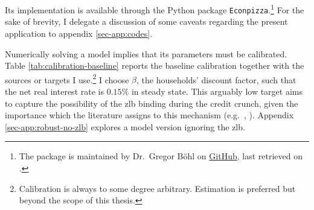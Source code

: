 \documentclass[a4paper,12pt]{article} %
\numberwithin{equation}{section} %
\numberwithin{figure}{section}
\numberwithin{table}{section}
\begin{document}
Its implementation is available through the Python package \texttt{Econpizza}.\footnote{The package is maintained by Dr.~Gregor Böhl on \href{https://github.com/gboehl/econpizza}{GitHub}, last retrieved on .} For the sake of brevity, I delegate a discussion of some caveats regarding the present application to appendix \ref{sec-app:codes}.

Numerically solving a model implies that its parameters must be calibrated. Table \ref{tab:calibration-baseline} reports the baseline calibration together with the sources or targets I use.\footnote{Calibration is always to some degree arbitrary. Estimation is preferred but beyond the scope of this thesis.} I choose $\beta$, the households' discount factor, such that the net real interest rate is $0.15\%$ in steady state. This arguably low target aims to capture the possibility of the \Gls{zlb} binding during the credit crunch, given the importance which the literature assigns to this mechanism (e.g.~\cite{egg2012}, \cite{gl2017}). Appendix \ref{sec-app:robust-no-zlb} explores a model version ignoring the \Gls{zlb}.
\end{document}
